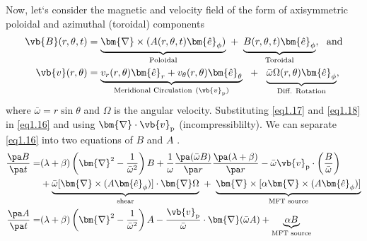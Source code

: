 Now, let`s consider the magnetic and velocity field of the form of axisymmetric poloidal and azimuthal (toroidal) components
\begin{align}
    \vb{B}(r,\theta,t)&=\underbrace{\bm{\nabla}\times (A(r, \theta, t)\bm{\hat{e}}_\phi)}_{\text{Poloidal}}~+~\underbrace{B(r,\theta,t)\bm{\hat{e}}_\phi}_{\text{Toroidal}}, ~~\text{and} \label{eq1.17}\\
     \vb{v}(r,\theta)&=\underbrace{v_r(r,\theta)\bm{\hat{e}}_r+v_\theta(r,\theta)\bm{\hat{e}}_\theta}_{\text{Meridional  Circulation}~(\vb{v}_{\rm p})}~~+~~\underbrace{\bar{\omega}\Omega(r,\theta)\bm{\hat{e}}_\phi}_{\text{Diff. Rotation}}, \label{eq1.18}
\end{align}
where $\bar{\omega}=r\sin{\theta}$ and $\Omega$ is the angular velocity. Substituting \autoref{eq1.17} and \ref{eq1.18} in \autoref{eq1.16} and using $\bm{\nabla}\cdot\vb{v}_{\rm p}$ (incompressiblilty). We can separate \autoref{eq1.16} into two equations of $B$ and $A$ \citep[for derivation see ][]{Choudhuri1998book, Charbonneau2010, Priest2014book}.
\begin{align}
    \frac{\pa B}{\pa t}=&(\lambda+\beta)\left( \bm{\nabla}^2-\frac{1}{\bar{\omega}^2}\right)B+\frac{1}{\omega}\frac{\pa(\bar{\omega}B)}{\pa r}\frac{\pa(\lambda+\beta)}{\pa r}-\bar{\omega}\vb{v}_{\rm p}\cdot\left( \frac{B}{\bar{\omega}}\right)\nonumber\\
    &+\underbrace{\bar{\omega}[\bm{\nabla}\times(A\bm{\hat{e}}_\phi)]\cdot\bm{\nabla}\Omega}_{\text{shear}}~+~\underbrace{\bm{\nabla}\times[\alpha\bm{\nabla}\times(A\bm{\hat{e}}_\phi)]}_{\text{MFT source}}\label{eq1.19}\\
    \frac{\pa A}{\pa t}=&(\lambda+\beta)\left( \bm{\nabla}^2-\frac{1}{\bar{\omega}^2}\right)A-\frac{\vb{v}_{\rm p}}{\bar{\omega}}\cdot\bm{\nabla}(\bar{\omega}A)+\underbrace{\alpha B}_{\text{MFT source}} \label{eq1.20}
\end{align}

